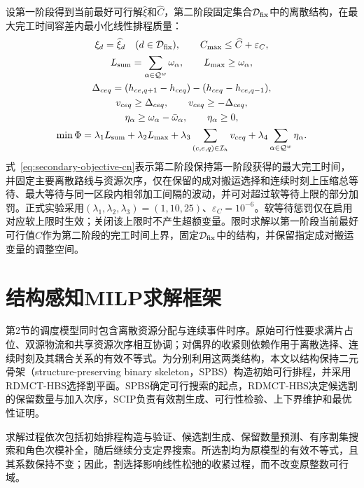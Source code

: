 \documentclass[journal]{IEEEtran}
\newcommand{\method}{RDMCT-HBS}
\begin{document}
设第一阶段得到当前最好可行解$\widehat\xi$和$\widehat C$，第二阶段固定集合$\mathcal D_{\rm fix}$中的离散结构，在最大完工时间容差内最小化线性排程质量：
\begin{equation}
\begin{gathered}
\xi_d=\widehat\xi_d\quad(d\in\mathcal D_{\rm fix}),\qquad
C_{\max}\le\widehat C+\varepsilon_C,\\
L_{\rm sum}=\sum_{\alpha\in\mathcal Q^w}\omega_\alpha,\qquad
L_{\max}\ge\omega_\alpha,\\
\Delta_{ceq}=(h_{ce,q+1}-h_{ceq})-(h_{ceq}-h_{ce,q-1}),\\
v_{ceq}\ge\Delta_{ceq},\qquad v_{ceq}\ge-\Delta_{ceq},\\
\eta_\alpha\ge\omega_\alpha-\bar\omega_\alpha,\qquad
\eta_\alpha\ge0,\\
\min\Phi=\lambda_1L_{\rm sum}+\lambda_2L_{\max}
+\lambda_3\sum_{(c,e,q)\in\mathcal I_h}v_{ceq}
+\lambda_4\sum_{\alpha\in\mathcal Q^w}\eta_\alpha.
\end{gathered}
\label{eq:secondary-objective-cn}
\end{equation}
式~\eqref{eq:secondary-objective-cn}表示第二阶段保持第一阶段获得的最大完工时间，并固定主要离散路线与资源次序，仅在保留的成对搬运选择和连续时刻上压缩总等待、最大等待与同一区段内相邻加工间隔的波动，并可对超过软等待上限的部分加罚。正式实验采用$(\lambda_1,\lambda_2,\lambda_3)=(1,10,25)$、$\varepsilon_C=10^{-6}$。软等待惩罚仅在启用对应软上限时生效；关闭该上限时不产生超额变量。限时求解以第一阶段当前最好可行值$\widehat C$作为第二阶段的完工时间上界，固定$\mathcal D_{\rm fix}$中的结构，并保留指定成对搬运变量的调整空间。

\section{结构感知MILP求解框架}

第2节的调度模型同时包含离散资源分配与连续事件时序。原始可行性要求满片占位、双源物流和共享资源次序相互协调；对偶界的收紧则依赖作用于离散选择、连续时刻及其耦合关系的有效不等式。为分别利用这两类结构，本文以结构保持二元骨架（structure-preserving binary skeleton，SPBS）构造初始可行排程，并采用\method{}选择割平面。SPBS确定可行搜索的起点，\method{}决定候选割的保留数量与加入次序，SCIP负责有效割生成、可行性检验、上下界维护和最优性证明\cite{achterberg2009scip,bestuzheva2023scip}。

求解过程依次包括初始排程构造与验证、候选割生成、保留数量预测、有序割集搜索和角色次模补全，随后继续分支定界搜索。所选割均为原模型的有效不等式，且其系数保持不变；因此，割选择影响线性松弛的收紧过程，而不改变原整数可行域。
\end{document}
